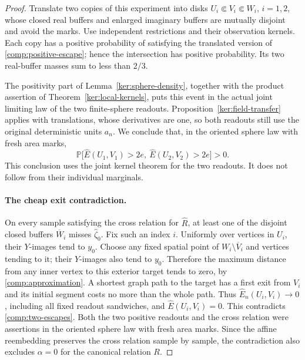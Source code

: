 \documentclass[11pt]{article}
\numberwithin{equation}{section}
\theoremstyle{definition}
\theoremstyle{remark}
\newcommand{\1}{\mathbf 1}
\begin{document}
\begin{proof}
Translate two copies of this experiment into disks
$U_i\Subset V_i\Subset W_i$, $i=1,2$, whose closed real buffers
and enlarged imaginary buffers are mutually disjoint and avoid
the marks.  Use independent restrictions and their observation
kernels.  Each copy has a positive probability of satisfying the
translated version of \eqref{comp:positive-escape}; hence the
intersection has positive probability.  Its two real-buffer
masses sum to less than $2/3$.

The positivity part of Lemma~\ref{ker:sphere-density}, together
with the product assertion of Theorem~\ref{ker:local-kernels},
puts this event in the actual joint limiting law of the two
finite-sphere readouts.  Proposition~\ref{ker:field-transfer} applies
with translations, whose derivatives are one, so both readouts
still use the original deterministic units $a_n$.  We conclude
that, in the oriented sphere law with fresh area marks,
\begin{equation}
 \label{comp:two-escapes}
 \mathbb P\bigl[\widehat E(U_1,V_1)>2e,\
          \widehat E(U_2,V_2)>2e\bigr]>0.
\end{equation}
This conclusion uses the joint kernel theorem for the two
readouts.  It does not follow from their individual marginals.

\paragraph{The cheap exit contradiction.}
On every sample satisfying the cross relation for $\widehat R$,
at least one of the disjoint closed buffers $\overline W_i$
misses $\widehat\zeta_0$.  Fix
such an index $i$.  Uniformly over vertices in $U_i$, their
$Y$-images tend to $y_0$.  Choose any fixed spatial point of
$W_i\setminus\overline V_i$ and vertices tending to it; their
$Y$-images also tend to $y_0$.  Therefore the maximum distance
from any inner vertex to this exterior target tends to zero,
by \eqref{comp:approximation}.  A shortest graph path to the
target has a first exit from $V_i$ and its initial segment costs
no more than the whole path.  Thus
$\widehat E_n(U_i,V_i)\to0$, including all fixed readout sandwiches,
and $\widehat E(U_i,V_i)=0$.  This contradicts
\eqref{comp:two-escapes}.  Both the two positive readouts and the
cross relation were assertions in the oriented sphere law with
fresh area marks.  Since the affine reembedding preserves the
cross relation sample by sample, the contradiction also excludes
$\alpha=0$ for the canonical relation $R$.
\end{proof}
\end{document}
